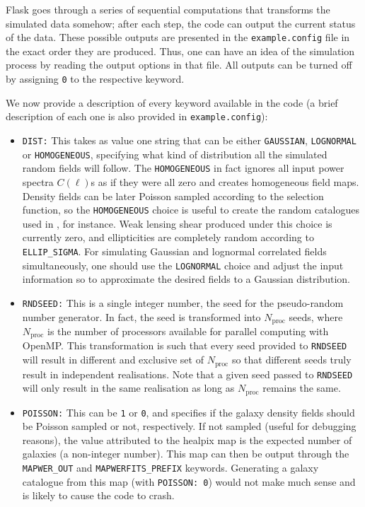 \documentclass[12pt]{book} %
\newcommand{\nv}[1]{\mathrm{#1}}                 %
\begin{document}
{\sc Flask} goes through a series of sequential computations that transforms the simulated data somehow; 
after each step, the code can output the current status of the data. These possible outputs are 
presented in the {\tt example.config} file in the exact order they are produced. Thus, one can 
have an idea of the simulation process by reading the output options in that file. All outputs 
can be turned off by assigning {\tt 0} to the respective keyword.

We now provide a description of every keyword available in the code (a brief description of 
each one is also provided in {\tt example.config}):

\begin{itemize}

\item {\tt DIST:} This takes as value one string that can be either {\tt GAUSSIAN}, 
  {\tt LOGNORMAL} or {\tt HOMOGENEOUS}, specifying what kind of distribution all 
  the simulated random fields will follow. The {\tt HOMOGENEOUS} in fact ignores 
  all input power spectra $C(\ell)$s as if they were all zero and creates homogeneous 
  field maps. Density fields can be later Poisson sampled according to the selection 
  function, so the {\tt HOMOGENEOUS} choice is useful to create the random catalogues 
  used in \citet{LandySzalay93x}, for instance. Weak lensing shear produced under this 
  choice is currently zero, and ellipticities are completely random according to 
  {\tt ELLIP\_SIGMA}. For simulating Gaussian and lognormal correlated fields 
  simultaneously, one should use the {\tt LOGNORMAL} choice and adjust the input 
  information so to approximate the desired fields to a Gaussian distribution.

\item {\tt RNDSEED:} This is a single integer number, the seed for the pseudo-random 
  number generator. In fact, the seed is transformed into $N_{\nv{proc}}$ seeds, where 
  $N_{\nv{proc}}$ is the number of processors available for parallel computing with 
  {\sc OpenMP}. This transformation is such that every seed provided to {\tt RNDSEED} 
  will result in different and exclusive set of $N_{\nv{proc}}$ so that different seeds truly 
  result in independent realisations. Note that a given seed passed to {\tt RNDSEED} will 
  only result in the same realisation as long as $N_{\nv{proc}}$ remains the same.

\item {\tt POISSON:} This can be {\tt 1} or {\tt 0}, and specifies if the galaxy density 
  fields should be Poisson sampled or not, respectively. If not sampled (useful for debugging 
  reasons), the value attributed to the {\sc healpix} map is the expected number of galaxies 
  (a non-integer number). This map can then be output through the {\tt MAPWER\_OUT} and 
  {\tt MAPWERFITS\_PREFIX} keywords. Generating a galaxy catalogue from this map (with 
  {\tt POISSON: 0}) would not make much sense and is likely to cause the code to crash.


\end{itemize}
\end{document}

